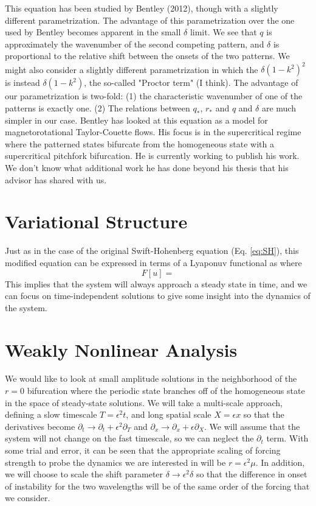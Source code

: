 \documentclass[api,pof,pre,12pt,a4paper]{revtex4-1}
\newcommand{\beqn}{\begin{equation}}
\newcommand{\eeqn}{\end{equation}}
\begin{document}
This equation has been studied by Bentley (2012), though with a slightly different parametrization.  The advantage of this parametrization over the one used by Bentley becomes apparent in the small $\delta$ limit.  We see that $q$ is approximately the wavenumber of the second competing pattern, and $\delta$ is proportional to the relative shift between the onsets of the two patterns.   We might also consider a slightly different parametrization in which the $\delta (1-k^2)^2$ is instead $\delta (1-k^2)$, the so-called "Proctor term" (I think).  The advantage of our parametrization is two-fold: (1) the characteristic wavenumber of one of the patterns is exactly one. (2) The relations between $q_*$, $r_*$ and $q$ and $\delta$ are much simpler in our case.    Bentley has looked at this equation as a model for magnetorotational Taylor-Couette flows.  His focus is in the supercritical regime where the patterned states bifurcate from the homogeneous state with a supercritical pitchfork bifurcation.  He is currently working to publish his work.  We don't know what additional work he has done beyond his thesis that his advisor has shared with us.

\section{Variational Structure}
Just as in the case of the original Swift-Hohenberg equation (Eq. \ref{eq:SH}), this modified equation can be expressed in terms of a Lyaponuv functional as 
where
\beqn
F[u]=
\eeqn
This implies that the system will always approach a steady state in time, and we can focus on time-independent solutions to give some insight into the dynamics of the system.

\section{Weakly Nonlinear Analysis}
We would like to look at small amplitude solutions in the neighborhood of the $r=0$ bifurcation where the periodic state branches off of the homogeneous state in the space of steady-state solutions.  We will take a multi-scale approach, defining a slow timescale $T=\epsilon^2t$, and long spatial scale $X=\epsilon x$ so that the derivatives become $\partial_t \rightarrow \partial_t+\epsilon^2\partial_T$ and $\partial_x \rightarrow \partial_x+\epsilon\partial_X$.  We will assume that the system will not change on the fast timescale, so we can neglect the $\partial_t$ term. With some trial and error, it can be seen that the appropriate scaling of forcing strength to probe the dynamics we are interested in will be $r=\epsilon^2 \mu$. In addition, we will choose to scale the shift parameter $\delta\rightarrow\epsilon^2 \delta$ so that the difference in onset of instability for the two wavelengths will be of the same order of the forcing that we consider.
\end{document}
